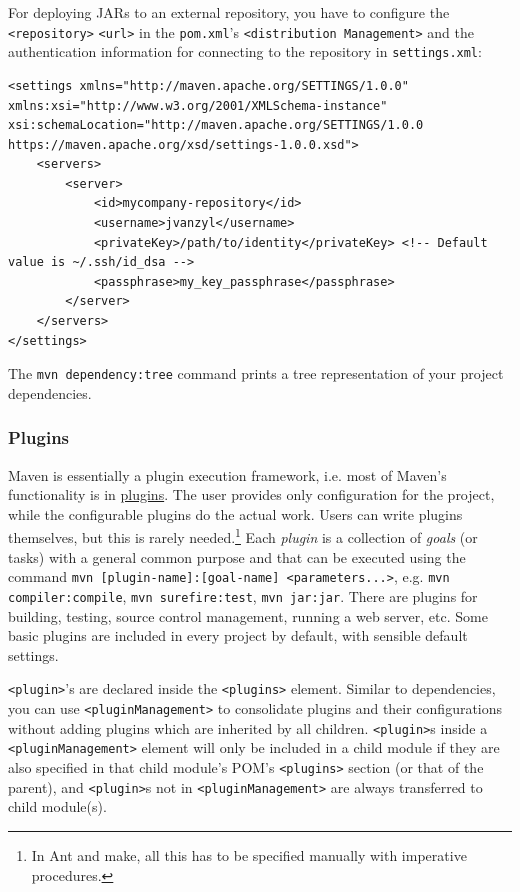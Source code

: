\documentclass[table, xcdraw]{article}%
\begin{document}
For deploying JARs to an external repository, you have to configure the \texttt{<repository>} \texttt{<url>} in the \texttt{pom.xml}'s \texttt{<distribution Management>} and the authentication information for connecting to the repository in \texttt{settings.xml}:

\begin{verbatim}
<settings xmlns="http://maven.apache.org/SETTINGS/1.0.0" xmlns:xsi="http://www.w3.org/2001/XMLSchema-instance"
xsi:schemaLocation="http://maven.apache.org/SETTINGS/1.0.0 https://maven.apache.org/xsd/settings-1.0.0.xsd">
    <servers>
        <server>
            <id>mycompany-repository</id>
            <username>jvanzyl</username>
            <privateKey>/path/to/identity</privateKey> <!-- Default value is ~/.ssh/id_dsa -->
            <passphrase>my_key_passphrase</passphrase>
        </server>
    </servers>
</settings>
\end{verbatim}

The \texttt{mvn dependency:tree} command prints a tree representation of your project dependencies.

\subsubsection{Plugins}

Maven is essentially a plugin execution framework, i.e. most of Maven's functionality is in \href{https://maven.apache.org/guides/getting-started/index.html}{plugins}. The user provides only configuration for the project, while the configurable plugins do the actual work. Users can write plugins themselves, but this is rarely needed.\footnote{In Ant and make, all this has to be specified manually with imperative procedures.} Each \emph{plugin} is a collection of \emph{goals} (or tasks) with a general common purpose and that can be executed using the command \texttt{mvn [plugin-name]:[goal-name] <parameters...>}, e.g. \texttt{mvn compiler:compile}, \texttt{mvn surefire:test}, \texttt{mvn jar:jar}. There are plugins for building, testing, source control management, running a web server, etc. Some basic plugins are included in every project by default, with sensible default settings.

\texttt{<plugin>}'s are declared inside the \texttt{<plugins>} element. Similar to dependencies, you can use \texttt{<pluginManagement>} to consolidate plugins and their configurations without adding plugins which are inherited by all children. \texttt{<plugin>}s inside a \texttt{<pluginManagement>} element will only be included in a child module if they are also specified in that child module's POM's \texttt{<plugins>} section (or that of the parent), and \texttt{<plugin>}s not in \texttt{<pluginManagement>} are always transferred to child module(s).
\end{document}
